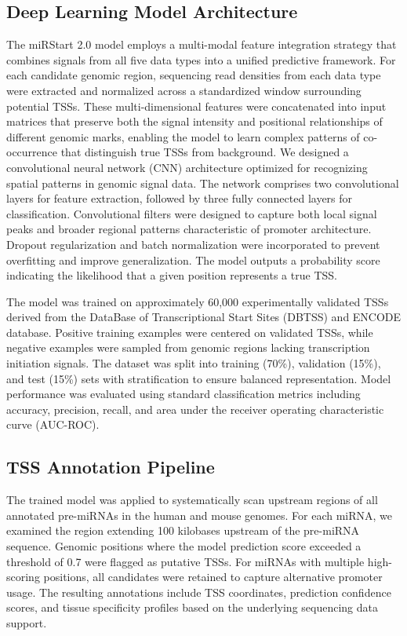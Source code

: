 \subsection{Deep Learning Model Architecture}

The miRStart 2.0 model employs a multi-modal feature integration strategy that combines signals from all five data types into a unified predictive framework. For each candidate genomic region, sequencing read densities from each data type were extracted and normalized across a standardized window surrounding potential TSSs. These multi-dimensional features were concatenated into input matrices that preserve both the signal intensity and positional relationships of different genomic marks, enabling the model to learn complex patterns of co-occurrence that distinguish true TSSs from background. We designed a convolutional neural network (CNN) architecture optimized for recognizing spatial patterns in genomic signal data. The network comprises two convolutional layers for feature extraction, followed by three fully connected layers for classification. Convolutional filters were designed to capture both local signal peaks and broader regional patterns characteristic of promoter architecture. Dropout regularization and batch normalization were incorporated to prevent overfitting and improve generalization. The model outputs a probability score indicating the likelihood that a given position represents a true TSS.

The model was trained on approximately 60,000 experimentally validated TSSs derived from the DataBase of Transcriptional Start Sites (DBTSS) and ENCODE database. Positive training examples were centered on validated TSSs, while negative examples were sampled from genomic regions lacking transcription initiation signals. The dataset was split into training (70\%), validation (15\%), and test (15\%) sets with stratification to ensure balanced representation. Model performance was evaluated using standard classification metrics including accuracy, precision, recall, and area under the receiver operating characteristic curve (AUC-ROC).

\subsection{TSS Annotation Pipeline}

The trained model was applied to systematically scan upstream regions of all annotated pre-miRNAs in the human and mouse genomes. For each miRNA, we examined the region extending 100 kilobases upstream of the pre-miRNA sequence. Genomic positions where the model prediction score exceeded a threshold of 0.7 were flagged as putative TSSs. For miRNAs with multiple high-scoring positions, all candidates were retained to capture alternative promoter usage. The resulting annotations include TSS coordinates, prediction confidence scores, and tissue specificity profiles based on the underlying sequencing data support.

